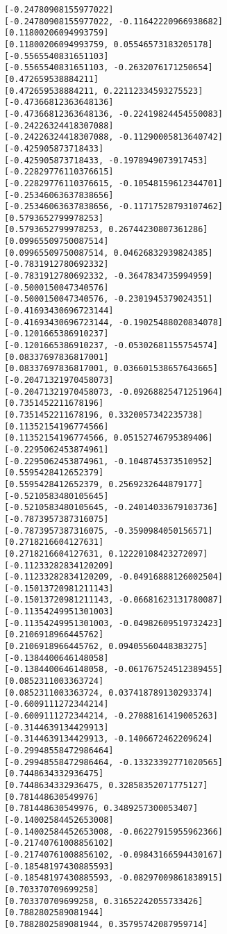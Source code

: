 \documentclass[11pt]{article}
\begin{document}
\begin{Verbatim}[commandchars=\\\{\}]
[-0.24780908155977022]
[-0.24780908155977022, -0.11642220966938682]
[0.11800206094993759]
[0.11800206094993759, 0.05546573183205178]
[-0.5565540831651103]
[-0.5565540831651103, -0.2632076171250654]
[0.472659538884211]
[0.472659538884211, 0.22112334593275523]
[-0.47366812363648136]
[-0.47366812363648136, -0.22419824454550083]
[-0.24226324418307088]
[-0.24226324418307088, -0.11290005813640742]
[-0.425905873718433]
[-0.425905873718433, -0.1978949073917453]
[-0.22829776110376615]
[-0.22829776110376615, -0.10548159612344701]
[-0.25346063637838656]
[-0.25346063637838656, -0.11717528793107462]
[0.5793652799978253]
[0.5793652799978253, 0.26744230807361286]
[0.09965509750087514]
[0.09965509750087514, 0.04626832939824385]
[-0.7831912780692332]
[-0.7831912780692332, -0.3647834735994959]
[-0.5000150047340576]
[-0.5000150047340576, -0.2301945379024351]
[-0.41693430696723144]
[-0.41693430696723144, -0.19025488020834078]
[-0.1201665386910237]
[-0.1201665386910237, -0.05302681155754574]
[0.08337697836817001]
[0.08337697836817001, 0.036601538657643665]
[-0.20471321970458073]
[-0.20471321970458073, -0.09268825471251964]
[0.7351452211678196]
[0.7351452211678196, 0.3320057342235738]
[0.11352154196774566]
[0.11352154196774566, 0.05152746795389406]
[-0.2295062453874961]
[-0.2295062453874961, -0.1048745373510952]
[0.5595428412652379]
[0.5595428412652379, 0.2569232644879177]
[-0.5210583480105645]
[-0.5210583480105645, -0.24014033679103736]
[-0.7873957387316075]
[-0.7873957387316075, -0.3590984050156571]
[0.2718216604127631]
[0.2718216604127631, 0.12220108423272097]
[-0.11233282834120209]
[-0.11233282834120209, -0.04916888126002504]
[-0.15013720981211143]
[-0.15013720981211143, -0.06681623131780087]
[-0.11354249951301003]
[-0.11354249951301003, -0.04982609519732423]
[0.2106918966445762]
[0.2106918966445762, 0.09405560448383275]
[-0.1384400646148058]
[-0.1384400646148058, -0.061767524512389455]
[0.0852311003363724]
[0.0852311003363724, 0.037418789130293374]
[-0.6009111272344214]
[-0.6009111272344214, -0.27088161419005263]
[-0.3144639134429913]
[-0.3144639134429913, -0.1406672462209624]
[-0.29948558472986464]
[-0.29948558472986464, -0.13323392771020565]
[0.7448634332936475]
[0.7448634332936475, 0.32858352071775127]
[0.781448630549976]
[0.781448630549976, 0.3489257300053407]
[-0.14002584452653008]
[-0.14002584452653008, -0.06227915955962366]
[-0.21740761008856102]
[-0.21740761008856102, -0.09843166594430167]
[-0.18548197430885593]
[-0.18548197430885593, -0.08297009861838915]
[0.703370709699258]
[0.703370709699258, 0.31652242055733426]
[0.7882802589081944]
[0.7882802589081944, 0.35795742087959714]

\end{Verbatim}
\end{document}
